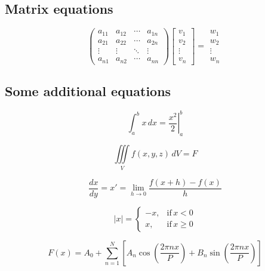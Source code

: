 \subsection{Matrix equations}
\begin{equation}
    \begin{pmatrix}
        a_{11} & a_{12} & \cdots & a_{1n} \\
        a_{21} & a_{22} & \cdots & a_{2n} \\
        \vdots & \vdots & \ddots & \vdots \\
        a_{n1} & a_{n2} & \cdots & a_{nn}
    \end{pmatrix}            
    \begin{bmatrix}
        v_1 \\
        v_2 \\
        \vdots \\
        v_n
    \end{bmatrix}
    =
    \begin{matrix}
        w_1 \\
        w_2 \\
        \vdots \\
        w_n
    \end{matrix}
\end{equation}

\subsection{Some additional equations}
\begin{equation}
    \int_a^b x \, dx = \left.\frac{x^2}{2} \right|_a^b
\end{equation}

\begin{equation}
    \iiint\limits_V f(x,y,z) \, dV = F
\end{equation}

\begin{equation}
    \frac{dx}{dy} = x' = \lim_{h \to 0} \frac{f(x + h) - f(x)}{h}
\end{equation}

\begin{equation}
    \left| x \right| =
    \begin{cases}
        -x, & \text{if} \, x < 0 \\
        x,  & \text{if} \, x \geq 0
    \end{cases}
\end{equation}

\begin{equation}
    F(x) = A_0 + \sum_{n=1}^N \left[ A_n \cos \left( \frac{2 \pi n x}{P} \right) + B_n \sin \left( \frac{2 \pi n x}{P} \right) \right]
\end{equation}

